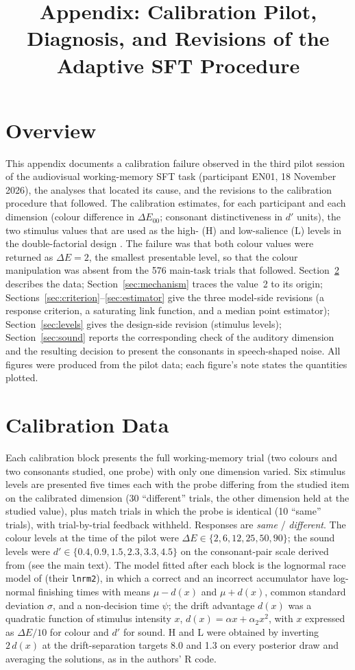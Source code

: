\documentclass[man,12pt,floatsintext,natbib]{apa7}
\title{Appendix: Calibration Pilot, Diagnosis, and Revisions of the Adaptive SFT Procedure}
\begin{document}
\appendix

\section{Overview}

This appendix documents a calibration failure observed in the third pilot session of the audiovisual working-memory SFT task (participant EN01, 18 November 2026), the analyses that located its cause, and the revisions to the calibration procedure that followed. The calibration estimates, for each participant and each dimension (colour difference in $\Delta E_{00}$; consonant distinctiveness in $d'$ units), the two stimulus values that are used as the high- (H) and low-salience (L) levels in the double-factorial design \citep{houpt2014}. The failure was that both colour values were returned as $\Delta E = 2$, the smallest presentable level, so that the colour manipulation was absent from the 576 main-task trials that followed. Section~\ref{sec:data} describes the data; Section~\ref{sec:mechanism} traces the value~2 to its origin; Sections~\ref{sec:criterion}--\ref{sec:estimator} give the three model-side revisions (a response criterion, a saturating link function, and a median point estimator); Section~\ref{sec:levels} gives the design-side revision (stimulus levels); Section~\ref{sec:sound} reports the corresponding check of the auditory dimension and the resulting decision to present the consonants in speech-shaped noise. All figures were produced from the pilot data; each figure's note states the quantities plotted.

\section{Calibration Data}\label{sec:data}

Each calibration block presents the full working-memory trial (two colours and two consonants studied, one probe) with only one dimension varied. Six stimulus levels are presented five times each with the probe differing from the studied item on the calibrated dimension (30 \enquote{different} trials, the other dimension held at the studied value), plus match trials in which the probe is identical (10 \enquote{same} trials), with trial-by-trial feedback withheld. Responses are \emph{same} / \emph{different}. The colour levels at the time of the pilot were $\Delta E \in \{2, 6, 12, 25, 50, 90\}$; the sound levels were $d' \in \{0.4, 0.9, 1.5, 2.3, 3.3, 4.5\}$ on the consonant-pair scale derived from \citet{millernicely1955} (see the main text). The model fitted after each block is the lognormal race model of \citet{houpt2014} (their \texttt{lnrm2}), in which a correct and an incorrect accumulator have log-normal finishing times with means $\mu - d(x)$ and $\mu + d(x)$, common standard deviation $\sigma$, and a non-decision time $\psi$; the drift advantage $d(x)$ was a quadratic function of stimulus intensity $x$, $d(x) = \alpha x + \alpha_2 x^2$, with $x$ expressed as $\Delta E / 10$ for colour and $d'$ for sound. H and L were obtained by inverting $2\,d(x)$ at the drift-separation targets 8.0 and 1.3 on every posterior draw and averaging the solutions, as in the authors' R code.
\end{document}
